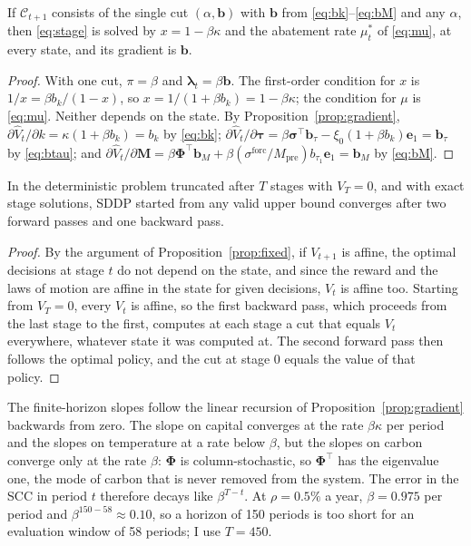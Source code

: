 \begin{proposition}
\label{prop:fixed}
If $\mathcal{C}_{t+1}$ consists of the single cut $(\alpha, \bm{b})$ with $\bm{b}$ from \eqref{eq:bk}--\eqref{eq:bM} and any $\alpha$, then \eqref{eq:stage} is solved by $x = 1 - \beta\kappa$ and the abatement rate $\mu^*_t$ of \eqref{eq:mu}, at every state, and its gradient is $\bm{b}$.
\end{proposition}

\begin{proof}
With one cut, $\pi = \beta$ and $\bm{\lambda}_t = \beta\bm{b}$. The first-order condition for $x$ is $1/x = \beta b_k/(1-x)$, so $x = 1/(1+\beta b_k) = 1 - \beta\kappa$; the condition for $\mu$ is \eqref{eq:mu}. Neither depends on the state. By Proposition~\ref{prop:gradient}, $\partial \hat V_t/\partial k = \kappa(1 + \beta b_k) = b_k$ by \eqref{eq:bk}; $\partial \hat V_t/\partial \bm{\tau} = \beta\bm{\sigma}^\top\bm{b}_\tau - \xi_0(1+\beta b_k)\bm{e}_1 = \bm{b}_\tau$ by \eqref{eq:btau}; and $\partial \hat V_t/\partial \bm{M} = \beta\bm{\Phi}^\top\bm{b}_M + \beta(\sigma^{\text{forc}}/M_{\text{pre}}) b_{\tau_1}\bm{e}_1 = \bm{b}_M$ by \eqref{eq:bM}.
\end{proof}

\begin{corollary}
\label{cor:two}
In the deterministic problem truncated after $T$ stages with $V_T = 0$, and with exact stage solutions, SDDP started from any valid upper bound converges after two forward passes and one backward pass.
\end{corollary}

\begin{proof}
By the argument of Proposition~\ref{prop:fixed}, if $V_{t+1}$ is affine, the optimal decisions at stage $t$ do not depend on the state, and since the reward and the laws of motion are affine in the state for given decisions, $V_t$ is affine too. Starting from $V_T = 0$, every $V_t$ is affine, so the first backward pass, which proceeds from the last stage to the first, computes at each stage a cut that equals $V_t$ everywhere, whatever state it was computed at. The second forward pass then follows the optimal policy, and the cut at stage 0 equals the value of that policy.
\end{proof}

\begin{remark}[Truncation]
\label{rem:truncation}
The finite-horizon slopes follow the linear recursion of Proposition~\ref{prop:gradient} backwards from zero. The slope on capital converges at the rate $\beta\kappa$ per period and the slopes on temperature at a rate below $\beta$, but the slopes on carbon converge only at the rate $\beta$: $\bm{\Phi}$ is column-stochastic, so $\bm{\Phi}^\top$ has the eigenvalue one, the mode of carbon that is never removed from the system. The error in the SCC in period $t$ therefore decays like $\beta^{T-t}$. At $\rho = 0.5\%$ a year, $\beta = 0.975$ per period and $\beta^{150 - 58} \approx 0.10$, so a horizon of 150 periods is too short for an evaluation window of 58 periods; I use $T = 450$.
\end{remark}

